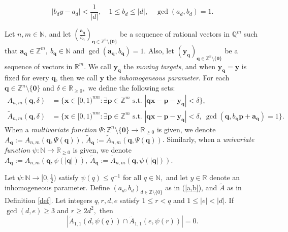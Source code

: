 \documentclass[10pt,a4paper]{amsart}
\begin{document}
\begin{equation}\label{a,b}
    |b_d y - a_d| < \frac{1}{|d|}, \quad 1\leq b_d \leq |d|, \quad \gcd(a_d, b_d) = 1.
\end{equation}

\begin{definition}\label{def}
    Let $n,m \in \mathbb{N}$, and let $(\frac{\mathbf{a}_\mathbf{q}}{b_\mathbf{q}})_{\mathbf{q} \in \mathbb{Z}^n \setminus \{\mathbf{0}\}}$ be a sequence of rational vectors in $\mathbb{Q}^m$ such that $\mathbf{a}_\mathbf{q} \in \mathbb{Z}^m,\ b_\mathbf{q} \in \mathbb{N}$ and $\gcd(\mathbf{a}_\mathbf{q}, b_\mathbf{q}) = 1.$ Also, let $(\mathbf{y}_\mathbf{q})_{\mathbf{q} \in \mathbb{Z}^n \setminus \{\mathbf{0}\}}$ be a sequence of vectors in $\mathbb{R}^m$. We call $\mathbf{y}_\mathbf{q}$ the \emph{moving targets}, and when $\mathbf{y}_\mathbf{q} = \mathbf{y}$ is fixed for every $\mathbf{q}$, then we call $\mathbf{y}$ the \emph{inhomogeneous parameter}. For each $\mathbf{q} \in \mathbb{Z}^n \setminus \{\mathbf{0}\}$ and $\delta \in \mathbb{R}_{\geq 0},$ we define the following sets:
\begin{align*}
    A_{n,m}(\mathbf{q},\delta) &= \{\mathbf{x} \in [0,1)^{nm} : \exists \mathbf{p} \in \mathbb{Z}^m \text{ s.t. } |\mathbf{qx} - \mathbf{p} - \mathbf{y}_\mathbf{q}| < \delta\}, \\
    \tilde{A}_{n,m}(\mathbf{q},\delta) &= \{\mathbf{x} \in [0,1)^{nm} : \exists \mathbf{p} \in \mathbb{Z}^m \text{ s.t. } |\mathbf{qx} - \mathbf{p} - \mathbf{y}_\mathbf{q}| <\delta, \ \gcd(\mathbf{q}, b_\mathbf{q}\mathbf{p} + \mathbf{a}_\mathbf{q}) = 1\}.
\end{align*}
    When a \emph{multivariate function} $\Psi : \mathbb{Z}^n \setminus \{\mathbf{0}\} \to \mathbb{R}_{\geq 0}$ is given, we denote $A_\mathbf{q} := A_{n,m}(\mathbf{q}, \Psi(\mathbf{q})),\ \tilde{A}_\mathbf{q} := \tilde{A}_{n,m}(\mathbf{q}, \Psi(\mathbf{q}))$. Similarly, when a \emph{univariate function} $\psi : \mathbb{N} \to \mathbb{R}_{\geq 0}$ is given, we denote $A_\mathbf{q} := A_{n,m}(\mathbf{q}, \psi(|\mathbf{q}|)),\ \tilde{A}_\mathbf{q} := \tilde{A}_{n,m}(\mathbf{q}, \psi(|\mathbf{q}|))$.
\end{definition}

\begin{lemma}\label{mainlemma}
    Let $\psi: \mathbb{N} \to [0,\frac{1}{2})$ satisfy $\psi(q) \leq q^{-1}$ for all $q \in \mathbb{N},$ and let $y \in \mathbb{R}$ denote an inhomogeneous parameter. Define $(a_d,b_d)_{d \in \mathbb{Z} \setminus \{0\}}$ as in (\ref{a,b}), and  $\tilde{A}$ as in Definition \ref{def}. Let integers $q,r,d,e$ satisfy $1\leq r < q$ and $1\leq |e| < |d|$. If $\gcd(d,e) \geq 3$ and $r \geq 2d^2,$ then
    $$|\tilde A_{1,1} (d, \psi(q)) \cap \tilde A_{1,1}(e, \psi(r))| = 0.$$
\end{lemma}
\end{document}
